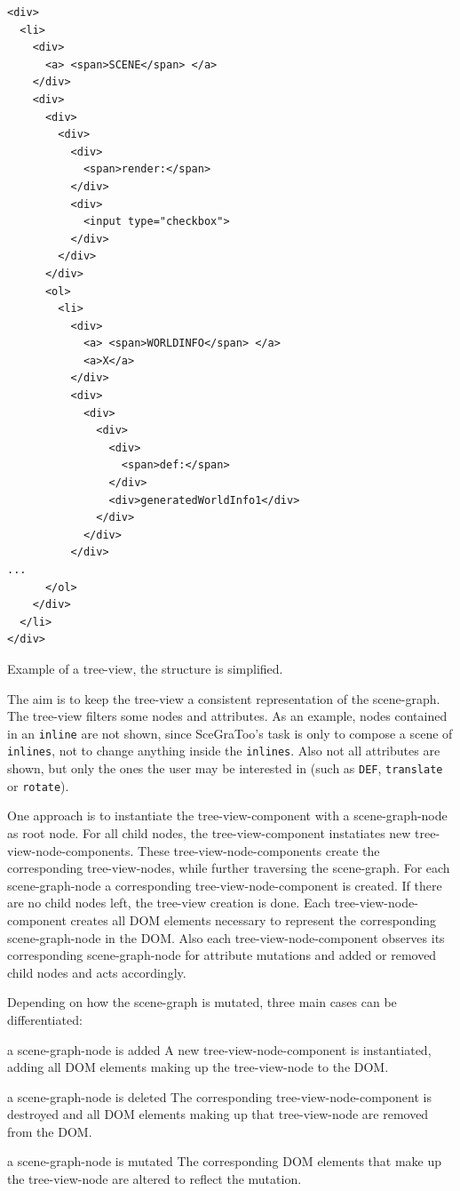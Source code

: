 \begin{listing}
  \begin{verbatim}
<div>
  <li>
    <div>
      <a> <span>SCENE</span> </a>
    </div>
    <div>
      <div>
        <div>
          <div>
            <span>render:</span>
          </div>
          <div>
            <input type="checkbox">
          </div>
        </div>
      </div>
      <ol>
        <li>
          <div>
            <a> <span>WORLDINFO</span> </a>
            <a>X</a>
          </div>
          <div>
            <div>
              <div>
                <div>
                  <span>def:</span>
                </div>
                <div>generatedWorldInfo1</div>
              </div>
            </div>
          </div>
...
      </ol>
    </div>
  </li>
</div>
  \end{verbatim}
  \caption{Example of a tree-view, the structure is simplified.}
  \label{list:tree-view}
\end{listing}

The aim is to keep the tree-view a consistent representation of the scene-graph.
The tree-view filters some nodes and attributes. As an example, nodes contained
in an \texttt{inline} are not shown, since  SceGraToo's task is only to compose
a scene of \texttt{inlines}, not to change anything inside the \texttt{inlines}.
Also not all attributes are shown, but only the ones the user may be interested
in (such as \texttt{DEF}, \texttt{translate} or \texttt{rotate}).

One approach is to instantiate the tree-view-component with a
scene-graph-node as root node. For all child nodes, the tree-view-component
instatiates new tree-view-node-components. These tree-view-node-components
create the corresponding tree-view-nodes, while further traversing the
scene-graph. For each scene-graph-node a corresponding tree-view-node-component
is created. If there are no child nodes left, the tree-view creation is done.
Each tree-view-node-component creates all \gls{DOM} elements necessary to represent
the corresponding scene-graph-node in the \gls{DOM}. Also each
tree-view-node-component observes its corresponding scene-graph-node for
attribute mutations and added or removed child nodes and acts accordingly.

Depending on how the scene-graph is mutated, three main cases can be differentiated:

\begin{description*}
  \item[a scene-graph-node is added]
    A new tree-view-node-component is instantiated, adding all \gls{DOM} elements making up the tree-view-node to the \gls{DOM}.
  \item[a scene-graph-node is deleted]
    The corresponding tree-view-node-component is destroyed and all \gls{DOM} elements making up that tree-view-node are removed from the \gls{DOM}.
  \item[a scene-graph-node is mutated]
    The corresponding \gls{DOM} elements that make up the  tree-view-node are altered to reflect the mutation.
\end{description*}

